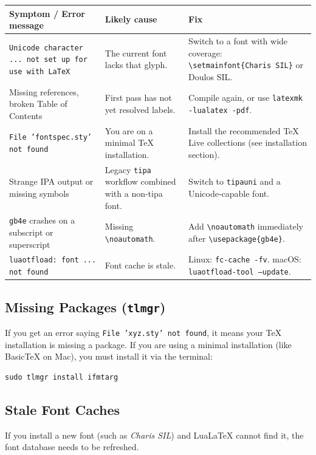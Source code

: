 \documentclass[11pt,a4paper]{article}
\begin{document}
\begin{center}
\small
\renewcommand{\arraystretch}{1.8}  %
\begin{tabular}{p{4.8cm} p{3.6cm} p{5.5cm}}
\toprule
\textbf{Symptom / Error message} & \textbf{Likely cause} & \textbf{Fix} \\
\midrule
\texttt{Unicode character ... not set up for use with LaTeX} & The current font lacks that glyph. & Switch to a font with wide coverage: \texttt{\textbackslash setmainfont\{Charis SIL\}} or Doulos SIL. \\
Missing references, broken Table of Contents & First pass has not yet resolved labels. & Compile again, or use \texttt{latexmk -lualatex -pdf}. \\
\texttt{File 'fontspec.sty' not found} & You are on a minimal TeX installation. & Install the recommended TeX Live collections (see installation section). \\
Strange IPA output or missing symbols & Legacy \texttt{tipa} workflow combined with a non-tipa font. & Switch to \texttt{tipauni} and a Unicode-capable font. \\
\texttt{gb4e} crashes on a subscript or superscript & Missing \texttt{\textbackslash noautomath}. & Add \texttt{\textbackslash noautomath} immediately after \texttt{\textbackslash usepackage\{gb4e\}}. \\
\texttt{luaotfload: font ... not found} & Font cache is stale. & Linux: \texttt{fc-cache -fv}. macOS: \texttt{luaotfload-tool --update}. \\
\bottomrule
\end{tabular}
\end{center}

\subsection{Missing Packages (\texttt{tlmgr})}
If you get an error saying \texttt{File 'xyz.sty' not found}, it means your TeX installation is missing a package. If you are using a minimal installation (like BasicTeX on Mac), you must install it via the terminal:
\begin{lstlisting}
sudo tlmgr install ifmtarg
\end{lstlisting}

\subsection{Stale Font Caches}
If you install a new font (such as \textit{Charis SIL}) and LuaLaTeX cannot find it, the font database needs to be refreshed.
\end{document}

